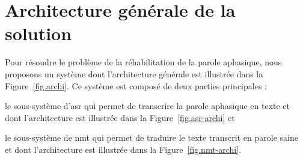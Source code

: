 \section{Architecture générale de la solution}

Pour résoudre le problème de la réhabilitation de la parole aphasique,
nous proposons un système dont l'architecture générale est illustrée dans la Figure~\ref{fig.archi}.
Ce système est composé de deux parties principales :
\begin{enumerate*}[label=(\alph*)]
    \item le sous-système d'\gls{asr} qui permet de transcrire la parole aphasique en texte
    et dont l'architecture est illustrée dans la Figure~\ref{fig.asr-archi} et
    \item le sous-système de \gls{nmt} qui permet de traduire le texte transcrit en parole saine
    et dont l'architecture est illustrée dans la Figure~\ref{fig.nmt-archi}.
\end{enumerate*}

